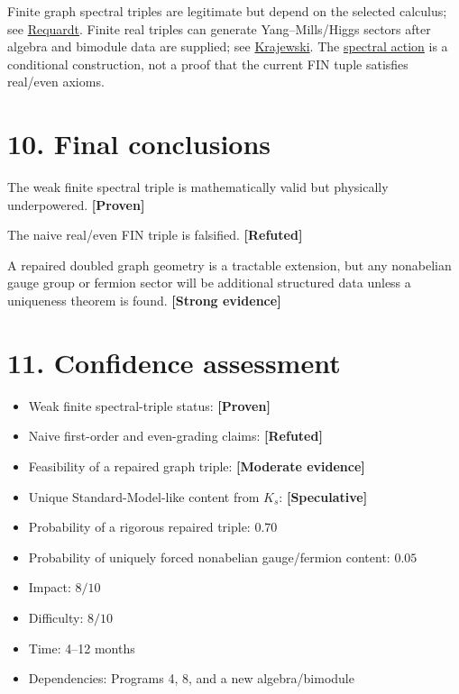 \documentclass[11pt,a4paper,openany]{report}
\newcommand{\statusProven}{\textcolor{fingreen}{[Proven]}}
\newcommand{\statusStrong}{\textcolor{finblue}{[Strong evidence]}}
\newcommand{\statusModerate}{\textcolor{finviolet}{[Moderate evidence]}}
\newcommand{\statusSpeculative}{\textcolor{finorange}{[Speculative]}}
\newcommand{\statusRefuted}{\textcolor{finred}{[Refuted]}}
\begin{document}
Finite graph spectral triples are legitimate but depend on the selected calculus; see \href{https://arxiv.org/abs/hep-th/9708010}{Requardt}. Finite real triples can generate Yang–Mills/\allowbreak{}Higgs sectors after algebra and bimodule data are supplied; see \href{https://arxiv.org/abs/hep-th/9701081}{Krajewski}. The \href{https://arxiv.org/abs/hep-th/9606001}{spectral action} is a conditional construction, not a proof that the current FIN tuple satisfies real/\allowbreak{}even axioms.

\section{10. Final conclusions}

The weak finite spectral triple is mathematically valid but physically underpowered. \textbf{\statusProven{}}

The naive real/\allowbreak{}even FIN triple is falsified. \textbf{\statusRefuted{}}

A repaired doubled graph geometry is a tractable extension, but any nonabelian gauge group or fermion sector will be additional structured data unless a uniqueness theorem is found. \textbf{\statusStrong{}}

\section{11. Confidence assessment}

\begin{itemize}
\item 
Weak finite spectral-triple status: \textbf{\statusProven{}}

\item 
Naive first-order and even-grading claims: \textbf{\statusRefuted{}}

\item 
Feasibility of a repaired graph triple: \textbf{\statusModerate{}}

\item 
Unique Standard-Model-like content from \(K_s\): \textbf{\statusSpeculative{}}

\item 
Probability of a rigorous repaired triple: \(0.70\)

\item 
Probability of uniquely forced nonabelian gauge/\allowbreak{}fermion content: \(0.05\)

\item 
Impact: \(8/10\)

\item 
Difficulty: \(8/10\)

\item 
Time: 4–12 months

\item 
Dependencies: Programs 4, 8, and a new algebra/\allowbreak{}bimodule

\end{itemize}
\end{document}
